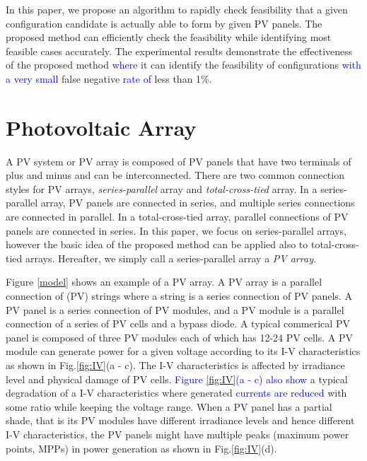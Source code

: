 \documentclass[conference]{pvsctran}
\newcommand{\michiko}{\textcolor{blue}}
\begin{document}
In this paper, we propose an algorithm to rapidly check feasibility that a given configuration candidate is actually able to form by given PV panels. 
The proposed method can efficiently check the feasibility while identifying most feasible cases accurately. 
The experimental results demonstrate the effectiveness of the proposed method \michiko{where} it can identify the feasibility of configurations \michiko{with a very small}   false negative \michiko{rate of} less than 1\%.


\section{Photovoltaic Array}\label{Sec2}

A PV system or PV array is composed of PV panels that have two terminals of plus and minus and can be interconnected.
There are two common connection styles for PV arrays, \textit{series-parallel} array and \textit{total-cross-tied} array. 
In a series-parallel array, PV panels are connected in series, and multiple series connections are connected in parallel. 
In a total-cross-tied array, parallel connections of PV panels are connected in series. 
In this paper, we focus on series-parallel arrays, however the basic idea of the proposed method can be applied also to total-cross-tied arrays. 
Hereafter, we simply call a series-parallel array a \textit{PV array}. 

Figure \ref{model} shows an example of a PV array. 
A PV array is a parallel connection of (PV) strings where a string is a series connection of PV panels. 
A PV panel is a series connection of PV modules, and a PV module is a parallel connection of a series of PV cells and a bypass diode. 
A typical commerical PV panel is composed of three PV modules each of which has 12-24 PV cells. 
A PV module can generate power for a given voltage according to its I-V characteristics as shown in Fig.\ref{fig:IV}(a - c). 
The I-V characteristics is affected by irradiance level and physical damage of PV cells. 
\michiko{Figure \ref{fig:IV}(a - c) also show} a typical degradation of a I-V characteristics where generated \michiko{currents are reduced} with some ratio while keeping the voltage range. 
When a PV panel has a partial shade, that is its PV modules have different irradiance levels and hence different I-V characteristics, the PV panels might have multiple peaks (maximum power points, MPPs) in power generation as shown in Fig.\ref{fig:IV}(d). 
\end{document}
